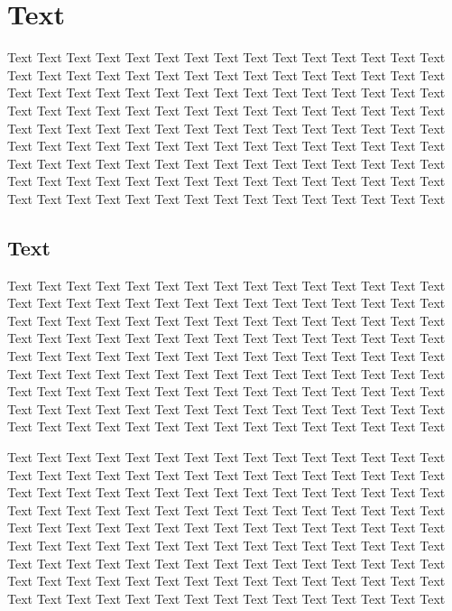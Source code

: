 \chapter{Text}

Text Text Text Text Text Text Text Text Text Text Text Text Text Text Text 
Text Text Text Text Text Text Text Text Text Text Text Text Text Text Text 
Text Text Text Text Text Text Text Text Text Text Text Text Text Text Text 
Text Text Text Text Text Text Text Text Text Text Text Text Text Text Text 
Text Text Text Text Text Text Text Text Text Text Text Text Text Text Text 
Text Text Text Text Text Text Text Text Text Text Text Text Text Text Text 
Text Text Text Text Text Text Text Text Text Text Text Text Text Text Text 
Text Text Text Text Text Text Text Text Text Text Text Text Text Text Text 
Text Text Text Text Text Text Text Text Text Text Text Text Text Text Text 

\section{Text}

Text Text Text Text Text Text Text Text Text Text Text Text Text Text Text 
Text Text Text Text Text Text Text Text Text Text Text Text Text Text Text 
Text Text Text Text Text Text Text Text Text Text Text Text Text Text Text 
Text Text Text Text Text Text Text Text Text Text Text Text Text Text Text 
Text Text Text Text Text Text Text Text Text Text Text Text Text Text Text 
Text Text Text Text Text Text Text Text Text Text Text Text Text Text Text 
Text Text Text Text Text Text Text Text Text Text Text Text Text Text Text 
Text Text Text Text Text Text Text Text Text Text Text Text Text Text Text 
Text Text Text Text Text Text Text Text Text Text Text Text Text Text Text 

Text Text Text Text Text Text Text Text Text Text Text Text Text Text Text 
Text Text Text Text Text Text Text Text Text Text Text Text Text Text Text 
Text Text Text Text Text Text Text Text Text Text Text Text Text Text Text 
Text Text Text Text Text Text Text Text Text Text Text Text Text Text Text 
Text Text Text Text Text Text Text Text Text Text Text Text Text Text Text 
Text Text Text Text Text Text Text Text Text Text Text Text Text Text Text 
Text Text Text Text Text Text Text Text Text Text Text Text Text Text Text 
Text Text Text Text Text Text Text Text Text Text Text Text Text Text Text 
Text Text Text Text Text Text Text Text Text Text Text Text Text Text Text 

